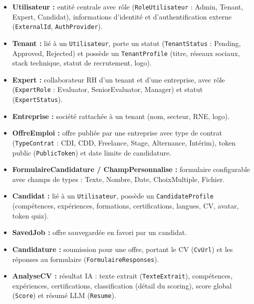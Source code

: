 \begin{itemize}
    \item \textbf{Utilisateur :} entité centrale avec rôle (\texttt{RoleUtilisateur} :
    Admin, Tenant, Expert, Candidat), informations d'identité et d'authentification
    externe (\texttt{ExternalId}, \texttt{AuthProvider}).

    \item \textbf{Tenant :} lié à un \texttt{Utilisateur}, porte un statut
    (\texttt{TenantStatus} : Pending, Approved, Rejected) et possède un
    \texttt{TenantProfile} (titre, réseaux sociaux, stack technique, statut de recrutement, logo).

    \item \textbf{Expert :} collaborateur RH d'un tenant et d'une entreprise, avec rôle
    (\texttt{ExpertRole} : Evaluator, SeniorEvaluator, Manager) et statut (\texttt{ExpertStatus}).

    \item \textbf{Entreprise :} société rattachée à un tenant (nom, secteur, RNE, logo).

    \item \textbf{OffreEmploi :} offre publiée par une entreprise avec type de contrat
    (\texttt{TypeContrat} : CDI, CDD, Freelance, Stage, Alternance, Intérim), token public
    (\texttt{PublicToken}) et date limite de candidature.

    \item \textbf{FormulaireCandidature / ChampPersonnalise :} formulaire configurable
    avec champs de types : Texte, Nombre, Date, ChoixMultiple, Fichier.

    \item \textbf{Candidat :} lié à un \texttt{Utilisateur}, possède un
    \texttt{CandidateProfile} (compétences, expériences, formations, certifications,
    langues, CV, avatar, token quiz).

    \item \textbf{SavedJob :} offre sauvegardée en favori par un candidat.

    \item \textbf{Candidature :} soumission pour une offre, portant le CV (\texttt{CvUrl})
    et les réponses au formulaire (\texttt{FormulaireResponses}).

    \item \textbf{AnalyseCV :} résultat IA : texte extrait (\texttt{TexteExtrait}),
    compétences, expériences, certifications, classification (détail du scoring),
    score global (\texttt{Score}) et résumé LLM (\texttt{Resume}).


\end{itemize}
